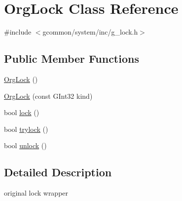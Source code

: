\hypertarget{class_org_lock}{\section{Org\-Lock Class Reference}
\label{class_org_lock}
}


{\ttfamily \#include $<$gcommon/system/inc/g\-\_\-lock.\-h$>$}

\subsection*{Public Member Functions}
\begin{DoxyCompactItemize}
\item 
\hyperlink{class_org_lock_a7052a50429112209f92b51f5bc7f8e8a}{Org\-Lock} ()
\item 
\hyperlink{class_org_lock_a9cd83be455e4dd5416d86f40e3d35bcb}{Org\-Lock} (const G\-Int32 kind)
\item 
bool \hyperlink{class_org_lock_a3dafc3958f75366501acd9e755997968}{lock} ()
\item 
bool \hyperlink{class_org_lock_affe56036a7ffb107512533a0ec8e8953}{trylock} ()
\item 
bool \hyperlink{class_org_lock_ae3378091d83bcb20359b7110e049b1f8}{unlock} ()
\end{DoxyCompactItemize}


\subsection{Detailed Description}
original lock wrapper 

